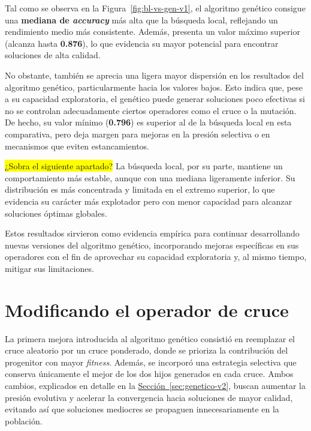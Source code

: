 Tal como se observa en la Figura~\ref{fig:bl-vs-gen-v1}, el algoritmo genético consigue una \textbf{mediana de \textit{accuracy}} más alta que la búsqueda local,
reflejando un rendimiento medio más consistente.
Además, presenta un valor máximo superior (alcanza hasta \textbf{0.876}), lo que evidencia su mayor potencial para encontrar soluciones de alta calidad.

No obstante, también se aprecia una ligera mayor dispersión en los resultados del algoritmo genético, particularmente hacia los valores bajos.
Esto indica que, pese a su capacidad exploratoria, el genético puede generar soluciones poco efectivas si no se controlan adecuadamente ciertos operadores como el cruce o la mutación.
De hecho, su valor mínimo (\textbf{0.796}) es superior al de la búsqueda local en esta comparativa, pero deja margen para mejoras en la presión selectiva o en mecanismos que eviten estancamientos.

\colorbox{yellow}{¿Sobra el siguiente apartado?}
La búsqueda local, por su parte, mantiene un comportamiento más estable, aunque con una mediana ligeramente inferior.
Su distribución es más concentrada y limitada en el extremo superior, lo que evidencia su carácter más explotador pero con menor capacidad para alcanzar soluciones óptimas globales.

Estos resultados sirvieron como evidencia empírica para continuar desarrollando nuevas versiones del algoritmo genético,
incorporando mejoras específicas en sus operadores con el fin de aprovechar su capacidad exploratoria y, al mismo tiempo, mitigar sus limitaciones.

\section{Modificando el operador de cruce}\label{sec:incorporacion-cruce}
La primera mejora introducida al algoritmo genético consistió en reemplazar el cruce aleatorio por un cruce ponderado,
donde se prioriza la contribución del progenitor con mayor \textit{fitness}.
Además, se incorporó una estrategia selectiva que conserva únicamente el mejor de los dos hijos generados en cada cruce.
Ambos cambios, explicados en detalle en la \hyperref[sec:genetico-v2]{Sección~\ref*{sec:genetico-v2}},
buscan aumentar la presión evolutiva y acelerar la convergencia hacia soluciones de mayor calidad,
evitando así que soluciones mediocres se propaguen innecesariamente en la población.

